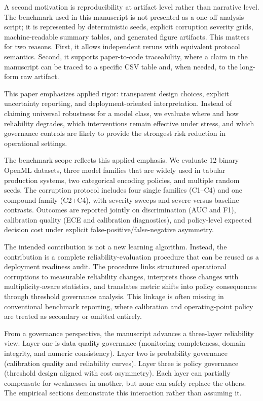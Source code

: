 \documentclass{AuthorGuide/ijitcs}
\begin{document}
A second motivation is reproducibility at artifact level rather than narrative level. The benchmark used in this manuscript is not presented as a one-off analysis script; it is represented by deterministic seeds, explicit corruption severity grids, machine-readable summary tables, and generated figure artifacts. This matters for two reasons. First, it allows independent reruns with equivalent protocol semantics. Second, it supports paper-to-code traceability, where a claim in the manuscript can be traced to a specific CSV table and, when needed, to the long-form raw artifact.

This paper emphasizes applied rigor: transparent design choices, explicit uncertainty reporting, and deployment-oriented interpretation. Instead of claiming universal robustness for a model class, we evaluate where and how reliability degrades, which interventions remain effective under stress, and which governance controls are likely to provide the strongest risk reduction in operational settings.

The benchmark scope reflects this applied emphasis. We evaluate 12 binary OpenML datasets, three model families that are widely used in tabular production systems, two categorical encoding policies, and multiple random seeds. The corruption protocol includes four single families (C1--C4) and one compound family (C2+C4), with severity sweeps and severe-versus-baseline contrasts. Outcomes are reported jointly on discrimination (AUC and F1), calibration quality (ECE and calibration diagnostics), and policy-level expected decision cost under explicit false-positive/false-negative asymmetry.

The intended contribution is not a new learning algorithm. Instead, the contribution is a complete reliability-evaluation procedure that can be reused as a deployment readiness audit. The procedure links structured operational corruptions to measurable reliability changes, interprets those changes with multiplicity-aware statistics, and translates metric shifts into policy consequences through threshold governance analysis. This linkage is often missing in conventional benchmark reporting, where calibration and operating-point policy are treated as secondary or omitted entirely.

From a governance perspective, the manuscript advances a three-layer reliability view. Layer one is data quality governance (monitoring completeness, domain integrity, and numeric consistency). Layer two is probability governance (calibration quality and reliability curves). Layer three is policy governance (threshold design aligned with cost asymmetry). Each layer can partially compensate for weaknesses in another, but none can safely replace the others. The empirical sections demonstrate this interaction rather than assuming it.
\end{document}
